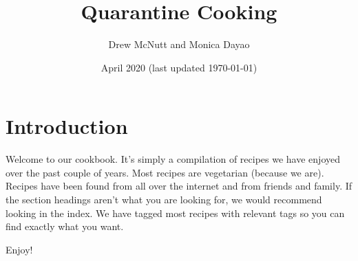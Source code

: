 \documentclass{article}
\title{Quarantine Cooking}
\author{Drew McNutt and Monica Dayao}
\date{April 2020 (last updated \today)}
\begin{document}
\maketitle
\tableofcontents
\newpage
\section{Introduction}
Welcome to our cookbook. It's simply a compilation of recipes we have enjoyed over the past couple of years. Most recipes are vegetarian (because we are). Recipes have been found from all over the internet and from friends and family. If the section headings aren't what you are looking for, we would recommend looking in the index. We have tagged most recipes with relevant tags so you can find exactly what you want.


\begin{center}
    \huge Enjoy!
\end{center}{}

\newpage
\end{document}
